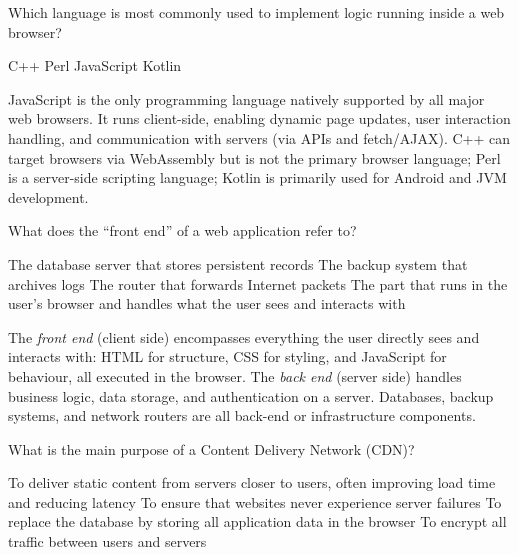 \documentclass[answers]{exam}
\begin{document}
\begin{questions}
\question Which language is most commonly used to implement logic running inside a web browser?

\begin{oneparchoices}
    \choice C++
    \choice Perl
    \correctchoice JavaScript
    \choice Kotlin
\end{oneparchoices}

\begin{solution}
    JavaScript is the only programming language natively supported by all major web browsers.
    It runs client-side, enabling dynamic page updates, user interaction handling, and communication with servers (via APIs and fetch/AJAX).
    C++ can target browsers via WebAssembly but is not the primary browser language; Perl is a server-side scripting language; Kotlin is primarily used for Android and JVM development.
\end{solution}

\question What does the ``front end'' of a web application refer to?

\begin{choices}
    \choice The database server that stores persistent records
    \choice The backup system that archives logs
    \choice The router that forwards Internet packets
    \correctchoice The part that runs in the user's browser and handles what the user sees and interacts with
\end{choices}

\begin{solution}
    The \textit{front end} (client side) encompasses everything the user directly sees and interacts with: HTML for structure, CSS for styling, and JavaScript for behaviour, all executed in the browser.
    The \textit{back end} (server side) handles business logic, data storage, and authentication on a server.
    Databases, backup systems, and network routers are all back-end or infrastructure components.
\end{solution}

\question What is the main purpose of a Content Delivery Network (CDN)?

\begin{choices}
    \correctchoice To deliver static content from servers closer to users, often improving load time and reducing latency
    \choice To ensure that websites never experience server failures
    \choice To replace the database by storing all application data in the browser
    \choice To encrypt all traffic between users and servers
\end{choices}


\end{questions}
\end{document}
